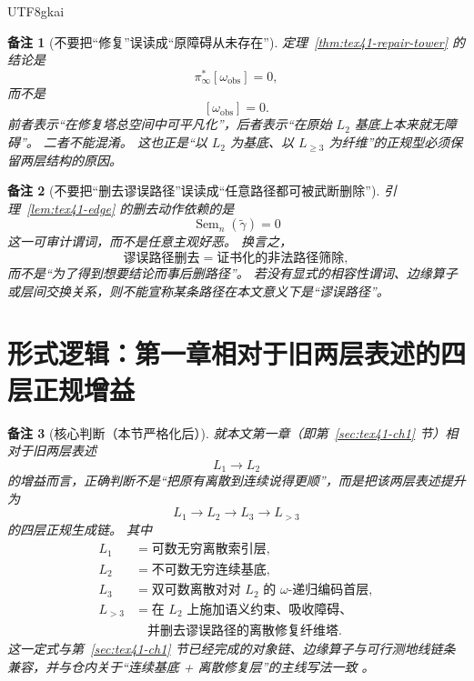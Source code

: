 \documentclass[12pt]{article}
\newtheorem{remark}{备注}[section]
\newcommand{\Sem}{\operatorname{Sem}}
\begin{document}
\begin{CJK*}{UTF8}{gkai}
\begin{remark}[不要把“修复”误读成“原障碍从未存在”]
定理~\ref{thm:tex41-repair-tower} 的结论是
\[
  \pi_\infty^\ast[\omega_{\mathrm{obs}}]=0,
\]
而不是
\[
  [\omega_{\mathrm{obs}}]=0.
\]
前者表示“在修复塔总空间中可平凡化”，后者表示“在原始 $L_2$ 基底上本来就无障碍”。
二者不能混淆。
这也正是“以 $L_2$ 为基底、以 $L_{\ge 3}$ 为纤维”的正规型必须保留两层结构的原因。
\end{remark}

\begin{remark}[不要把“删去谬误路径”误读成“任意路径都可被武断删除”]
引理~\ref{lem:tex41-edge} 的删去动作依赖的是
\[
  \Sem_n(\widetilde\gamma)=0
\]
这一可审计谓词，而不是任意主观好恶。
换言之，
\[
  \text{谬误路径删去}
  =
  \text{证书化的非法路径筛除},
\]
而不是“为了得到想要结论而事后删路径”。
若没有显式的相容性谓词、边缘算子或层间交换关系，则不能宣称某条路径在本文意义下是“谬误路径”。
\end{remark}

\section{形式逻辑：第一章相对于旧两层表述的四层正规增益}
\label{sec:tex41-ch2-upgrade}

\begin{remark}[核心判断（本节严格化后）]
就本文第一章（即第~\ref{sec:tex41-ch1} 节）相对于旧两层表述
\[
  L_1\to L_2
\]
的增益而言，正确判断不是“把原有离散到连续说得更顺”，而是把该两层表述提升为
\[
 L_1\to L_2\to L_3\to L_{>3}
\]
的四层正规生成链。
其中
\[
  \begin{aligned}
    L_1&=\text{可数无穷离散索引层},\\
    L_2&=\text{不可数无穷连续基底},\\
    L_3&=\text{双可数离散对对 $L_2$ 的 $\omega$-递归编码首层},\\
    L_{>3}&=\text{在 $L_2$ 上施加语义约束、吸收障碍、}\\
          &\quad \text{并删去谬误路径的离散修复纤维塔}.
  \end{aligned}
\]
这一定式与第~\ref{sec:tex41-ch1} 节已经完成的对象链、边缘算子与可行测地线链条兼容，并与仓内关于“连续基底 + 离散修复层”的主线写法一致
\cite{GaoZheng2025GFramework,GaoZhengAppVol1,RepoAppMathVol4Tex,RepoTex32HoleObstruction,
  RepoTex35ExtendedCertificationTower,RepoTex36HomotopyTwistBijection,RepoTex37SemanticGaugeRuntime,
  RepoTex38TerminalNormalForm}。
\end{remark}


\end{CJK*}
\end{document}
